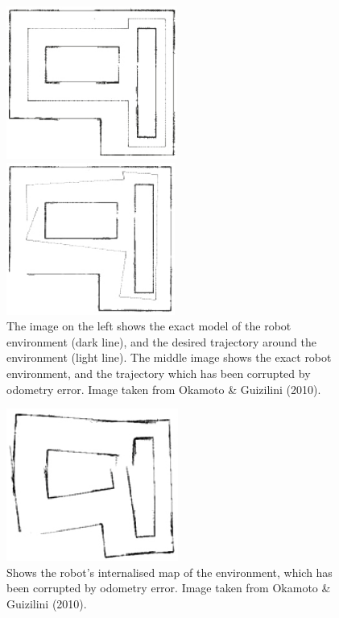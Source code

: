 \documentclass[a4paper]{article}
\begin{document}
\begin{figure}[h]
\centering
\begin{minipage}{0.45\textwidth}
\centering
\includegraphics[height=5cm]{exact}
\end{minipage}
\hspace{1cm}
\begin{minipage}{0.45\textwidth}
\centering
\includegraphics[height=5cm]{exact_odom}
\end{minipage}
\caption{The image on the left shows the exact model of the robot environment (dark line), and the desired trajectory around the environment (light line). The middle image shows the exact robot environment, and the trajectory which has been corrupted by odometry error. Image taken from Okamoto \& Guizilini (2010).}
\end{figure}

\begin{figure}[h]
\centering
\includegraphics[height=5cm]{odom_error_map}
\caption{Shows the robot's internalised map of the environment, which has been corrupted by odometry error. Image taken from Okamoto \& Guizilini (2010).}
\end{figure}
\end{document}

